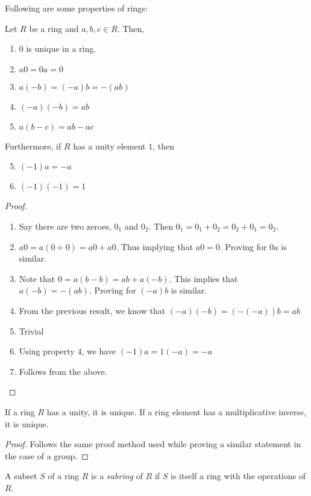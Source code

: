 Following are some properties of rings:

\begin{proposition}
	Let $R$ be a ring and $a,b,c\in R$. Then,
	\begin{enumerate}
		\item $0$ is unique in a ring.
		\item $a0=0a=0$
		\item $a(-b) = (-a)b = -(ab)$
		\item $(-a)(-b) = ab$
		\item $a(b-c) = ab - ac$
	\end{enumerate}
	Furthermore, if $R$ has a unity element $1$, then 
	\begin{enumerate}
		\setcounter{enumi}{4}
		\item $(-1)a = -a$
		\item $(-1)(-1) = 1$
	\end{enumerate}
\end{proposition}
\begin{proof}\hfill
	\begin{enumerate}
		\item Say there are two zeroes, $0_1$ and $0_2$. Then $0_1 = 0_1+0_2 = 0_2+0_1 = 0_2$. 
		\item $a0 = a(0+0) = a0 + a0$. Thus implying that $a0 = 0$. Proving for $0a$ is similar.
		\item Note that $0=a(b-b) = ab + a(-b)$. This implies that $a(-b) = -(ab)$. Proving for $(-a)b$ is similar.
		\item From the previous result, we know that $(-a)(-b) = (-(-a))b = ab$
		\item Trivial
		\item Using property $4$, we have $(-1)a = 1(-a) = -a$
		\item Follows from the above.
	\end{enumerate}
\end{proof}

\begin{proposition}
	If a ring $R$ has a unity, it is unique. If a ring element has a multiplicative inverse, it is unique.
\end{proposition}
\begin{proof}
	Follows the same proof method used while proving a similar statement in the case of a group.
\end{proof}

\begin{definition}[Subring]
	A subset $S$ of a ring $R$ is a \textit{subring} of $R$ if $S$ is itself a ring with the operations of $R$.
\end{definition}


